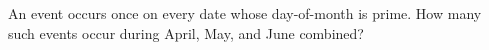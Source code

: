 An event occurs once on every date whose day-of-month is prime. How many such events occur during April, May, and June combined?
